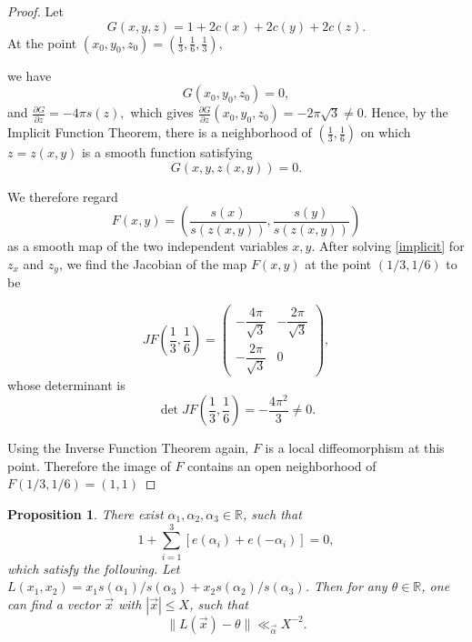 \documentclass[12pt]{article}
\newtheorem{proposition}{Proposition}
\theoremstyle{definition}
\begin{document}
\begin{proof}
Let
\[
G(x,y,z)=1+2c(x)+2c(y)+2c(z).
\]
At the point $(x_0,y_0,z_0)=\left(\frac13,\frac16,\frac13\right)$,

we have
\[
G(x_0,y_0,z_0)=0,
\]
and
$\frac{\partial G}{\partial z}=-4\pi s(z),$ which gives $\frac{\partial G}{\partial z}(x_0,y_0,z_0)
=-2\pi\sqrt3\neq0.$ Hence, by the Implicit Function Theorem, there is a neighborhood of
$\left(\frac13,\frac16\right)$ on which $z=z(x,y)$ is a smooth function
satisfying
\begin{equation}\label{implicit}
G(x,y,z(x,y))=0.
\end{equation}

We therefore regard
\[
F(x,y)
=
\left(
\frac{s(x)}{s(z(x,y))},
\frac{s(y)}{s(z(x,y))}
\right)
\]
as a smooth map of the two independent variables $x,y$. After solving \eqref{implicit} for $z_x$ and $z_y$, we find the Jacobian of the map $F(x,y)$ at the point $(1/3,1/6)$ to be







\[
JF\!\left(\frac13,\frac16\right)
=
\begin{pmatrix}
-\dfrac{4\pi}{\sqrt3} & -\dfrac{2\pi}{\sqrt3}\\[1.2ex]
-\dfrac{2\pi}{\sqrt3} & 0
\end{pmatrix},
\]
whose determinant is
\[
\det JF\!\left(\frac13,\frac16\right)
=
-\frac{4\pi^2}{3}\neq0.
\]

 Using the Inverse Function Theorem again,
$F$ is a local diffeomorphism at this point. Therefore the image of $F$ contains an open neighborhood of $F(1/3,1/6)=(1,1)$
\end{proof}
\begin{proposition}
    There exist $\alpha_1,\alpha_2,\alpha_3\in \mathbb{R}$, such that 
    \begin{equation}\label{zero-sum}
        1+\sum_{i=1}^3 \left[e(\alpha_i)+e(-\alpha_i)\right]=0,
    \end{equation}
    which satisfy the following. Let $L(x_1,x_2)=x_1s(\alpha_1)/s(\alpha_3)+x_2s(\alpha_2)/s(\alpha_3)$. Then for any $\theta\in \mathbb{R}$, one can find a vector $\vec{x}$ with $|\vec{x}|\leq X$, such that
    \begin{equation}
        \|L(\vec{x})-\theta \|\ll_{\vec{\alpha}} X^{-2}.
    \end{equation}
\end{proposition}
\end{document}
